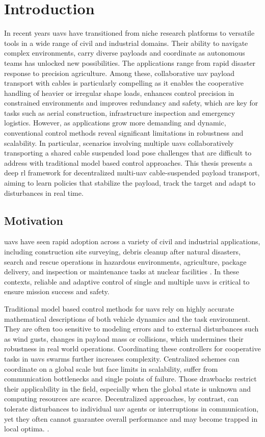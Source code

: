 \chapter{Introduction}
\glsresetall
In recent years \glspl{uav} have transitioned from niche research platforms to versatile tools in a wide range of civil and industrial domains. Their ability to navigate complex environments, carry diverse payloads and coordinate as autonomous teams has unlocked new possibilities. The applications range from rapid disaster response to precision agriculture. Among these, collaborative \gls{uav} payload transport with cables is particularly compelling as it enables the cooperative handling of heavier or irregular shape loads, enhances control precision in constrained environments and improves redundancy and safety, which are key for tasks such as aerial construction, infrastructure inspection and emergency logistics. However, as applications grow more demanding and dynamic, conventional control methods reveal significant limitations in robustness and scalability. In particular, scenarios involving multiple \glspl{uav} collaboratively transporting a shared cable suspended load pose challenges that are difficult to address with traditional model based control approaches.
This thesis presents a deep \gls{rl} framework for decentralized multi-\gls{uav} cable-suspended payload transport, aiming to learn policies that stabilize the payload, track the target and adapt to disturbances in real time.

\section{Motivation}
\glspl{uav} have seen rapid adoption across a variety of civil and industrial applications, including construction site surveying, debris cleanup after natural disasters, search and rescue operations in hazardous environments, agriculture, package delivery, and inspection or maintenance tasks at nuclear facilities \autocite{Idrissi2022AROA,Lyu2023UnmannedAVA,Chen2021FromUSA,Abbaraju2018SensingASA}. In these contexts, reliable and adaptive control of single and multiple \glspl{uav} is critical to ensure mission success and safety.

Traditional model based control methods for \glspl{uav} rely on highly accurate mathematical descriptions of both vehicle dynamics and the task environment. They are often too sensitive to modeling errors and to external disturbances such as wind gusts, changes in payload mass or collisions, which undermines their robustness in real world operations. Coordinating these controllers for cooperative tasks in \glspl{uav} swarms further increases complexity. Centralized schemes can coordinate on a global scale but face limits in scalability, suffer from communication bottlenecks and single points of failure. Those drawbacks restrict their applicability in the field, especially when the global state is unknown and computing resources are scarce. Decentralized approaches, by contrast, can tolerate disturbances to individual \gls{uav} agents or interruptions in communication, yet they often cannot guarantee overall performance and may become trapped in local optima. \autocite{batra_decentralized_2022, Zhou2020EGOSwarmAF}.

